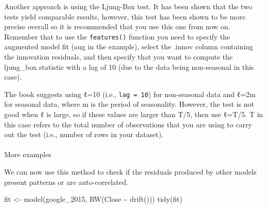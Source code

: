 \documentclass[
  letterpaper,
  DIV=11,
  numbers=noendperiod]{scrartcl}
\makeatletter
\let\oldparagraph\paragraph
\renewcommand{\paragraph}{
    \@ifstar
      \xxxParagraphStar
      \xxxParagraphNoStar
  }
\newcommand{\xxxParagraphStar}[1]{\oldparagraph*{#1}\mbox{}}
\newcommand{\xxxParagraphNoStar}[1]{\oldparagraph{#1}\mbox{}}
\newenvironment{Shaded}{\begin{snugshade}}{\end{snugshade}}
\newcommand{\FunctionTok}[1]{\textcolor[rgb]{0.28,0.35,0.67}{#1}}
\newcommand{\NormalTok}[1]{\textcolor[rgb]{0.00,0.23,0.31}{#1}}
\newcommand{\OtherTok}[1]{\textcolor[rgb]{0.00,0.23,0.31}{#1}}
\newcommand{\SpecialCharTok}[1]{\textcolor[rgb]{0.37,0.37,0.37}{#1}}
\newcommand*\circled[1]{\tikz[baseline=(char.base)]{
          \node[shape=circle,draw,inner sep=1pt] (char) {{\scriptsize#1}};}}
\makeatother
\begin{document}
Another approach is using the Ljung-Box test. It has been shown that the
two tests yield comparable results, however, this test has been shown to
be more precise overall so it is recommended that you use this one from
now on. Remember that to use the \texttt{features()} function you need
to specify the augmented model fit (aug in the example), select the
.innov column containing the innovation residuals, and then specify that
you want to compute the ljung\_box statistic with a lag of 10 (due to
the data being non-seasonal in this case).

\begin{tcolorbox}[enhanced jigsaw, bottomrule=.15mm, colframe=quarto-callout-important-color-frame, toptitle=1mm, breakable, colback=white, left=2mm, arc=.35mm, coltitle=black, opacitybacktitle=0.6, leftrule=.75mm, opacityback=0, rightrule=.15mm, title=\textcolor{quarto-callout-important-color}{\faExclamation}\hspace{0.5em}{Important}, colbacktitle=quarto-callout-important-color!10!white, bottomtitle=1mm, titlerule=0mm, toprule=.15mm]

The book suggests using ℓ=10 (i.e., \texttt{lag\ =\ 10}) for
non-seasonal data and ℓ=2m for seasonal data, where m is the period of
seasonality. However, the test is not good when ℓ is large, so if these
values are larger than T/5, then use ℓ=T/5. T in this case refers to the
total number of observations that you are using to carry out the test
(i.e., number of rows in your dataset).

\end{tcolorbox}

\paragraph{More examples}\label{more-examples-1}

We can now use this method to check if the residuals produced by other
models present patterns or are auto-correlated.

\label{annotated-cell-35}%
\begin{Shaded}
\begin{Highlighting}[]
\NormalTok{fit }\OtherTok{\textless{}{-}} \FunctionTok{model}\NormalTok{(google\_2015, }\FunctionTok{RW}\NormalTok{(Close }\SpecialCharTok{\textasciitilde{}} \FunctionTok{drift}\NormalTok{()))}
\FunctionTok{tidy}\NormalTok{(fit) }\hspace*{\fill}\NormalTok{\circled{1}}
\end{Highlighting}
\end{Shaded}
\end{document}
